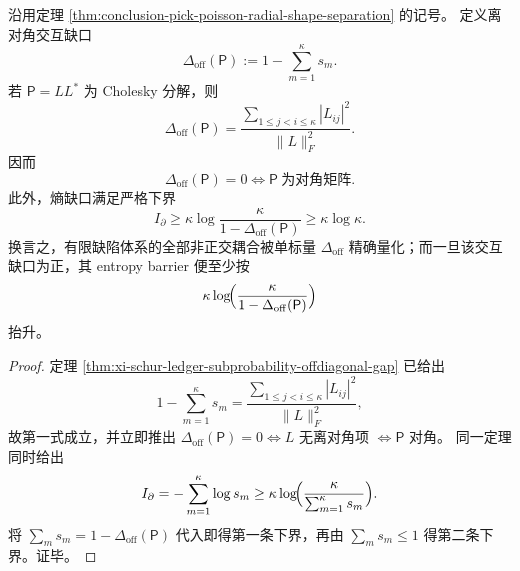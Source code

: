 \begin{corollary}[离对角交互缺口的精确公式与熵壁]\label{cor:conclusion-pick-poisson-offdiagonal-gap-entropy-wall}
沿用定理 \ref{thm:conclusion-pick-poisson-radial-shape-separation} 的记号。
定义离对角交互缺口
\[
\Delta_{\mathrm{off}}(\mathsf P):=1-\sum_{m=1}^{\kappa}s_m.
\]
若 \(\mathsf P=LL^\ast\) 为 Cholesky 分解，则
\[
\Delta_{\mathrm{off}}(\mathsf P)
=
\frac{\sum_{1\le j<i\le\kappa}|L_{ij}|^2}{\|L\|_F^2}.
\]
因而
\[
\Delta_{\mathrm{off}}(\mathsf P)=0
\iff
\mathsf P\ \text{为对角矩阵}.
\]
此外，熵缺口满足严格下界
\[
I_\partial
\ge
\kappa\log\frac{\kappa}{1-\Delta_{\mathrm{off}}(\mathsf P)}
\ge
\kappa\log\kappa .
\]
换言之，有限缺陷体系的全部非正交耦合被单标量 \(\Delta_{\mathrm{off}}\) 精确量化；而一旦该交互缺口为正，其 entropy barrier 便至少按
\[
\kappa\log\!\Bigl(\frac{\kappa}{1-\Delta_{\mathrm{off}}(\mathsf P)}\Bigr)
\]
抬升。
\end{corollary}
\begin{proof}
定理 \ref{thm:xi-schur-ledger-subprobability-offdiagonal-gap} 已给出
\[
1-\sum_{m=1}^{\kappa}s_m
=
\frac{\sum_{1\le j<i\le\kappa}|L_{ij}|^2}{\|L\|_F^2},
\]
故第一式成立，并立即推出
\(
\Delta_{\mathrm{off}}(\mathsf P)=0
\iff
L
\)
无离对角项
\(
\iff \mathsf P
\)
对角。
同一定理同时给出
\[
I_\partial=-\sum_{m=1}^{\kappa}\log s_m
\ge
\kappa\log\!\Bigl(\frac{\kappa}{\sum_{m=1}^{\kappa}s_m}\Bigr).
\]
将
\(
\sum_m s_m=1-\Delta_{\mathrm{off}}(\mathsf P)
\)
代入即得第一条下界，再由 \(\sum_m s_m\le 1\) 得第二条下界。证毕。
\end{proof}

